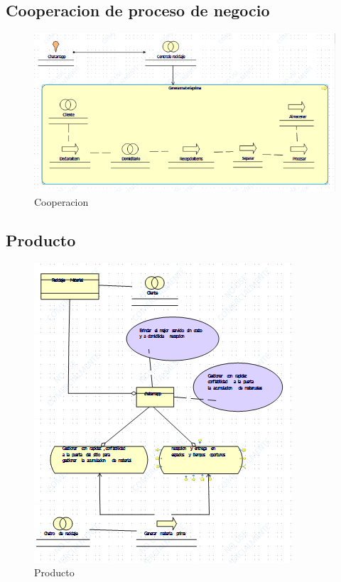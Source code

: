 \subsection{Cooperacion de proceso de negocio}
\begin{figure}[h!]
	\centering
	\includegraphics[width=0.8\linewidth]{Arquitectura/Negocio/imgs/Cooperacion de proceso de negocio.png}
	\caption{Cooperacion}
\end{figure}
\newpage

\subsection{Producto}
\begin{figure}[h!]
	\centering
	\includegraphics[width=0.8\linewidth]{Arquitectura/Negocio/imgs/Producto.png}
	\caption{Producto}
\end{figure}
\newpage

